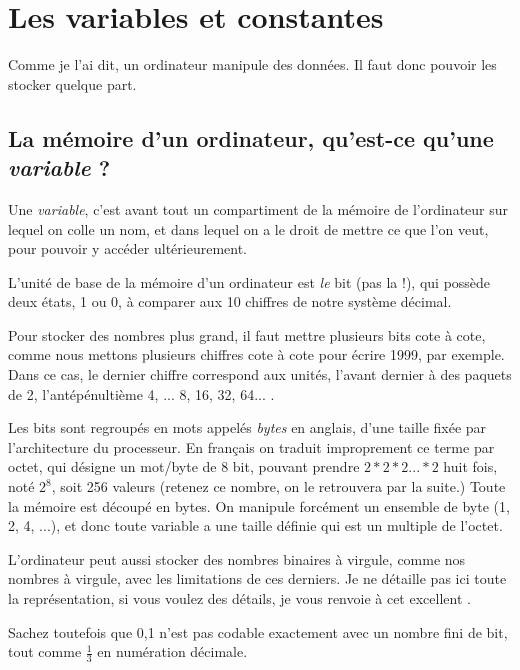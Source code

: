 \chapter{Les variables et constantes}
Comme je l'ai dit, un ordinateur manipule des données.
Il faut donc pouvoir les stocker quelque part.
\section{La mémoire d'un ordinateur, qu'est-ce qu'une \emph{variable} ?}
Une \emph{variable},
c'est avant tout un compartiment de la mémoire de l'ordinateur 
sur lequel on colle un nom,
et dans lequel on a le droit de mettre ce que l'on veut,
pour pouvoir y accéder ultérieurement.

L'unité de base de la mémoire d'un ordinateur est \emph{le} bit (pas la !),
qui possède deux états, 1 ou 0,
à comparer aux 10 chiffres de notre système décimal.

Pour stocker des nombres
plus grand, il faut mettre plusieurs bits cote à cote,
comme nous mettons plusieurs chiffres cote à cote pour écrire 1999, par exemple.
Dans ce cas, le dernier chiffre correspond aux unités, l'avant dernier à
des paquets de 2, l'antépénultième 4, ... 8, 16, 32, 64... .

Les bits sont regroupés en mots appelés \emph{bytes} en anglais,
d'une taille fixée par l'architecture du processeur.
En français on traduit improprement ce terme par octet,
qui désigne un mot/byte de 8 bit, pouvant prendre
\begin{math}2*2*2...*2\end{math} huit fois, noté \begin{math} 2^{8} \end{math},
soit 256 valeurs (retenez ce nombre, on le retrouvera par la suite.)
Toute la mémoire est découpé en bytes.
On manipule forcément un ensemble de byte (1, 2, 4, ...),
et donc toute variable a une taille définie qui est un multiple de l'octet.

L'ordinateur peut aussi stocker des nombres binaires à virgule,
comme nos nombres à virgule, avec les limitations de ces derniers.
Je ne détaille pas ici toute la représentation, si vous voulez des détails,
je vous renvoie à cet excellent .

Sachez toutefois que 0,1 n'est pas codable exactement avec un nombre fini de bit,
tout comme \(\frac{1}{3}\) en numération décimale.


